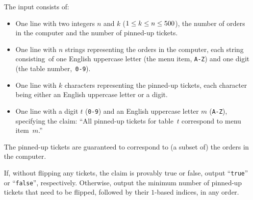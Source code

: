 \begin{Input}
    The input consists of:
    \begin{itemize}
        \item One line with two integers $n$ and $k$ ($1 \le k \le n \le 500$), the number of orders in the computer and the number of pinned-up tickets.
        \item One line with $n$ strings representing the orders in the computer,
            each string consisting~of one English uppercase letter (the menu item, \texttt{A-Z}) %
            and one digit (the table number,~\texttt{0-9}).
        \item One line with $k$ characters representing the pinned-up tickets, each character being either an English uppercase letter or a digit.
        \item One line with a digit $t$ (\texttt{0-9}) and an English uppercase letter $m$ (\texttt{A-Z}), specifying the claim:
            ``All pinned-up tickets for table~$t$ correspond to menu item~$m$.''
    \end{itemize}

    The pinned-up tickets are guaranteed to correspond to (a subset of) the orders in the computer.
\end{Input}

\begin{Output}
    If, without flipping any tickets, the claim is provably true or false, output ``\texttt{true}'' or ``\texttt{false}'', respectively.
    Otherwise, output the minimum number of pinned-up tickets that need to be flipped, followed by their $1$-based indices, in any order.
\end{Output}
